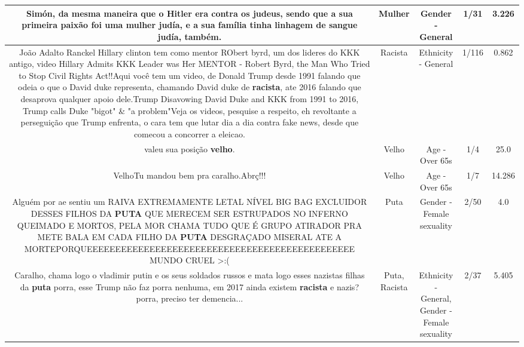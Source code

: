 \documentclass[11pt]{article}
\newlength\mylength
\begin{document}
\begin{center}
\begin{longtable}{|C{.65\mylength}|C{.30\mylength}|C{.12\mylength}|C{.12\mylength}|C{.12\mylength}|}
  \small Simón, da mesma maneira que o Hitler era contra os judeus, sendo que a sua primeira paixão foi uma \textbf{mulher} judía, e a sua família tinha linhagem de sangue judía, também.\normalsize   & Mulher & Gender - General & 1/31 & 3.226 \\  \hline
  \small João Adalto Ranckel Hillary clinton tem como mentor RObert byrd, um dos lideres do KKK antigo, video Hillary Admits KKK Leader was Her MENTOR - Robert Byrd, the Man Who Tried to Stop Civil Rights Act!!Aqui você tem um video, de Donald Trump desde 1991 falando que odeia o que o David duke representa, chamando David duke de \textbf{racista}, ate 2016 falando que desaprova qualquer apoio dele.Trump Disavowing David Duke and KKK from 1991 to 2016, Trump calls Duke "bigot" \& "a problem"Veja os videos, pesquise a respeito, eh revoltante a perseguição que Trump enfrenta, o cara tem que lutar dia a dia contra fake news, desde que comecou a concorrer a eleicao.\normalsize   & Racista & Ethnicity - General & 1/116 & 0.862 \\  \hline
  \small valeu sua posição \textbf{velho}.\normalsize   & Velho & Age - Over 65s & 1/4 & 25.0 \\  \hline
  \small VelhoTu mandou bem pra caralho.Abrç!!!\normalsize   & Velho & Age - Over 65s & 1/7 & 14.286 \\  \hline
  \small Alguém por ae sentiu um RAIVA EXTREMAMENTE LETAL NÍVEL BIG BAG EXCLUIDOR DESSES FILHOS DA \textbf{PUTA} QUE MERECEM SER ESTRUPADOS NO INFERNO QUEIMADO E MORTOS, PELA MOR CHAMA TUDO QUE É GRUPO ATIRADOR PRA METE BALA EM CADA FILHO DA \textbf{PUTA} DESGRAÇADO MISERAL ATE A MORTEPORQUEEEEEEEEEEEEEEEEEEEEEEEEEEEEEEEEEEEEEEEEEEEEEEE MUNDO CRUEL >:(\normalsize   & Puta & Gender - Female sexuality & 2/50 & 4.0 \\  \hline
  \small Caralho, chama logo o vladimir putin e os seus soldados russos e mata logo esses nazistas filhas da \textbf{puta} porra, esse Trump não faz porra nenhuma, em 2017 ainda existem \textbf{racista} e nazis? porra, preciso ter demencia...\normalsize   & Puta, Racista & Ethnicity - General, Gender - Female sexuality & 2/37 & 5.405 \\  \hline

\end{longtable}
\end{center}
\end{document}
